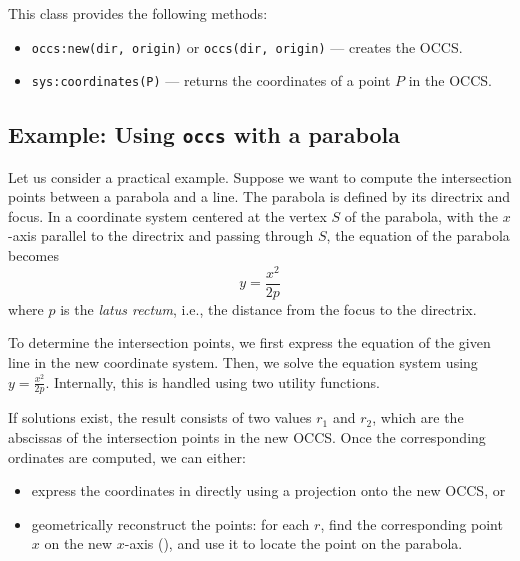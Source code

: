 This class provides the following methods:

\begin{itemize}
  \item \texttt{occs:new(dir, origin)} or \texttt{occs(dir, origin)} — creates the OCCS.
  \item \texttt{sys:coordinates(P)} — returns the coordinates of a point $P$ in the OCCS.
\end{itemize}

\subsection{Example: Using \texttt{occs} with a parabola}

Let us consider a practical example. Suppose we want to compute the intersection points between a parabola and a line. The parabola is defined by its directrix and focus. In a coordinate system centered at the vertex $S$ of the parabola, with the $x$-axis parallel to the directrix and passing through $S$, the equation of the parabola becomes
\[
y = \frac{x^2}{2p}
\]
where $p$ is the \emph{latus rectum}, i.e., the distance from the focus to the directrix.

\vspace{1em}

To determine the intersection points, we first express the equation of the given line in the new coordinate system. Then, we solve the equation system using $y = \frac{x^2}{2p}$. Internally, this is handled using two utility functions.

\vspace{1em}

If solutions exist, the result consists of two values $r_1$ and $r_2$, which are the abscissas of the intersection points in the new OCCS. Once the corresponding ordinates are computed, we can either:
\begin{itemize}
  \item express the coordinates in \TIKZ{} directly using a projection onto the new OCCS, or
  \item geometrically reconstruct the points: for each $r$, find the corresponding point $x$ on the new $x$-axis (), and use it to locate the point on the parabola.
\end{itemize}

